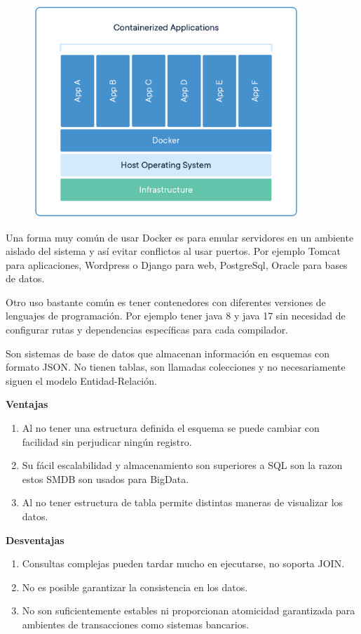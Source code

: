 \documentclass{exam}
\begin{document}
\begin{questions}
	
	\begin{figure}[H]
	    \centering
	    \includegraphics[width = 10cm]{imgCardenas/docker.png}
	\end{figure}
	
	Una forma muy común de usar Docker es para emular servidores en un ambiente aislado del sistema y así evitar conflictos al usar puertos. Por ejemplo Tomcat para aplicaciones, Wordpress o Django para web, PostgreSql, Oracle para bases de datos. 
	
	Otro uso bastante común es tener contenedores con diferentes versiones de lenguajes de programación. Por ejemplo tener java 8 y java 17 sin necesidad de configurar rutas y dependencias  específicas para cada compilador.
	
	
	\question Son sistemas de base de datos que almacenan información en esquemas con formato JSON. No tienen tablas, son llamadas colecciones y no necesariamente siguen el modelo Entidad-Relación.

\textbf{Ventajas}
\begin{enumerate}
	\item Al no tener una estructura definida el esquema se puede cambiar con facilidad sin perjudicar ningún registro.
	\item Su fácil escalabilidad y almacenamiento son superiores a SQL son la razon estos SMDB son usados para BigData.
	\item Al no tener estructura de tabla permite distintas maneras de visualizar los datos.
\end{enumerate}

\textbf{Desventajas}
\begin{enumerate}
	\item Consultas complejas pueden tardar mucho en ejecutarse, no soporta JOIN.
	\item No es posible garantizar la consistencia en los datos.
	\item No son suficientemente estables ni proporcionan atomicidad garantizada para ambientes de transacciones como sistemas bancarios.
\end{enumerate}
\end{questions}
\end{document}
